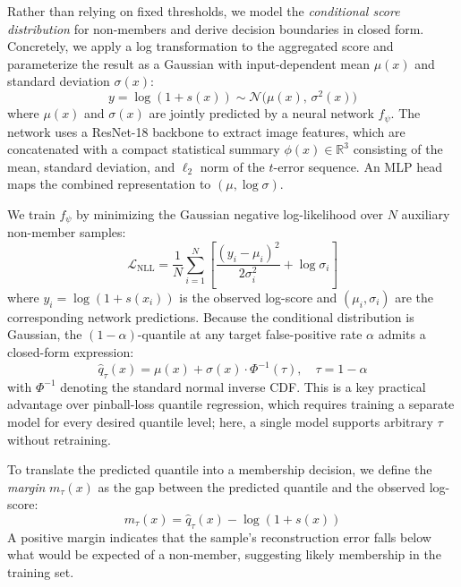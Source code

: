 \documentclass{article}
\begin{document}
Rather than relying on fixed thresholds, we model the \emph{conditional score distribution} for non-members and derive decision boundaries in closed form. Concretely, we apply a log transformation to the aggregated score and parameterize the result as a Gaussian with input-dependent mean $\mu(x)$ and standard deviation $\sigma(x)$:
\begin{equation}
y = \log(1 + s(x)) \sim \mathcal{N}\!\bigl(\mu(x),\, \sigma^2(x)\bigr)
\end{equation}
where $\mu(x)$ and $\sigma(x)$ are jointly predicted by a neural network $f_\psi$. The network uses a ResNet-18 backbone to extract image features, which are concatenated with a compact statistical summary $\phi(x) \in \mathbb{R}^3$ consisting of the mean, standard deviation, and $\ell_2$ norm of the $t$-error sequence. An MLP head maps the combined representation to $(\mu, \log\sigma)$.

We train $f_\psi$ by minimizing the Gaussian negative log-likelihood over $N$ auxiliary non-member samples:
\begin{equation}
\mathcal{L}_{\text{NLL}} = \frac{1}{N}\sum_{i=1}^{N}\left[\frac{(y_i - \mu_i)^2}{2\sigma_i^2} + \log\sigma_i\right]
\end{equation}
where $y_i = \log(1 + s(x_i))$ is the observed log-score and $(\mu_i, \sigma_i)$ are the corresponding network predictions. Because the conditional distribution is Gaussian, the $(1{-}\alpha)$-quantile at any target false-positive rate $\alpha$ admits a closed-form expression:
\begin{equation}
\hat{q}_\tau(x) = \mu(x) + \sigma(x) \cdot \Phi^{-1}(\tau), \quad \tau = 1 - \alpha
\end{equation}
with $\Phi^{-1}$ denoting the standard normal inverse CDF. This is a key practical advantage over pinball-loss quantile regression, which requires training a separate model for every desired quantile level; here, a single model supports arbitrary $\tau$ without retraining.

To translate the predicted quantile into a membership decision, we define the \emph{margin} $m_\tau(x)$ as the gap between the predicted quantile and the observed log-score:
\begin{equation}
m_\tau(x) = \hat{q}_\tau(x) - \log(1 + s(x))
\end{equation}
A positive margin indicates that the sample's reconstruction error falls below what would be expected of a non-member, suggesting likely membership in the training set.
\end{document}
